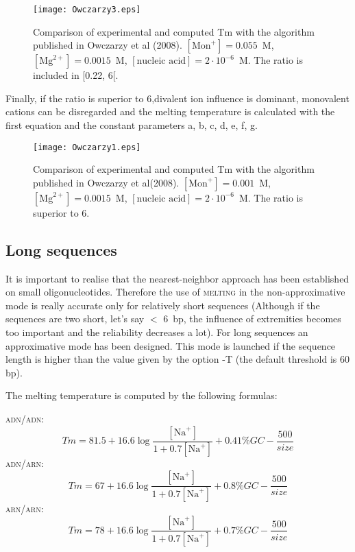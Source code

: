 \documentclass{article}
\begin{document}
\begin{figure}[H]
\texttt{[image: Owczarzy3.eps]}
\caption{Comparison of experimental and computed Tm with the algorithm published
in Owczarzy et al (2008). $[\mbox{Mon}^+] = 0.055$~M, $[\mbox{Mg}^{2+}] = 0.0015$~M, $[\mbox{nucleic acid}] =
2\cdot{}10^{-6}$~M. The ratio is included in [0.22, 6[.}
\end{figure}

Finally, if the ratio is superior to 6,divalent ion influence is dominant, monovalent cations can be 
disregarded and the melting temperature is calculated with the first equation and the constant parameters a, b, c, d,
e, f, g.

\begin{figure}[H]
\texttt{[image: Owczarzy1.eps]}
\caption{Comparison of experimental and computed Tm with the algorithm published
in Owczarzy et al(2008). $[\mbox{Mon}^+] = 0.001$~M, $[\mbox{Mg}^{2+}] = 0.0015$~M, $[\mbox{nucleic acid}] =
2\cdot{}10^{-6}$~M. The ratio is superior to 6.}
\end{figure}
    
\subsection{Long sequences }  
  It is important to realise that the nearest-neighbor approach 
has been established  on small oligonucleotides. Therefore the use of \textsc{melting} 
in the non-approximative  mode is really accurate only for relatively short 
sequences (Although if the sequences are two short, let's say $<$ 6~bp, the 
influence of extremities becomes too important and the  reliability decreases 
a lot). For long sequences an approximative mode has been designed. This mode is 
launched if the sequence length is higher than the value 
given by the option -T (the default threshold is 60 bp).
 
The melting temperature is computed by the following formulas:   

\textsc{adn/adn}:
\begin{displaymath}
Tm = 81.5 + 16.6\log\frac{[\mbox{Na}^+]}{1+0.7[\mbox{Na}^+]} + 0.41\% GC - \frac{500}{size}
\end{displaymath}
\textsc{adn/arn}:
\begin{displaymath}
Tm = 67 + 16.6\log\frac{[\mbox{Na}^+]}{1+0.7[\mbox{Na}^+]} + 0.8\% GC - \frac{500}{size}
\end{displaymath}
\textsc{arn/arn}:
\begin{displaymath}
Tm = 78 + 16.6\log\frac{[\mbox{Na}^+]}{1+0.7[\mbox{Na}^+]} + 0.7\% GC - \frac{500}{size}
\end{displaymath}
\end{document}
